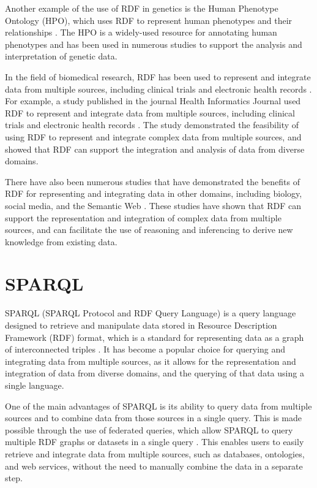 Another example of the use of RDF in genetics is the Human Phenotype Ontology (HPO), which uses RDF to represent human phenotypes and their relationships \citep*{robinson2010human}.  The HPO is a widely-used resource for annotating human phenotypes and has been used in numerous studies to support the analysis and interpretation of genetic data.

In the field of biomedical research, RDF has been used to represent and integrate data from multiple sources, including clinical trials and electronic health records \citep*{luz2015providing}.  For example, a study published in the journal Health Informatics Journal used RDF to represent and integrate data from multiple sources, including clinical trials and electronic health records \citep*{luz2015providing}.  The study demonstrated the feasibility of using RDF to represent and integrate complex data from multiple sources, and showed that RDF can support the integration and analysis of data from diverse domains.

There have also been numerous studies that have demonstrated the benefits of RDF for representing and integrating data in other domains, including biology, social media, and the Semantic Web \citep*{schreiber2014rdf,allemang2011semantic,heath2011linked}.  These studies have shown that RDF can support the representation and integration of complex data from multiple sources, and can facilitate the use of reasoning and inferencing to derive new knowledge from existing data.

\section{SPARQL}

SPARQL (SPARQL Protocol and RDF Query Language) is a query language designed to retrieve and manipulate data stored in Resource Description Framework (RDF) format, which is a standard for representing data as a graph of interconnected triples \citep*{prud2008sparql}.  It has become a popular choice for querying and integrating data from multiple sources, as it allows for the representation and integration of data from diverse domains, and the querying of that data using a single language.

One of the main advantages of SPARQL is its ability to query data from multiple sources and to combine data from those sources in a single query.  This is made possible through the use of federated queries, which allow SPARQL to query multiple RDF graphs or datasets in a single query \citetext{\citealp*{allemang2011semantic}; \citealp{rakhmawati2013querying}}.  This enables users to easily retrieve and integrate data from multiple sources, such as databases, ontologies, and web services, without the need to manually combine the data in a separate step.

